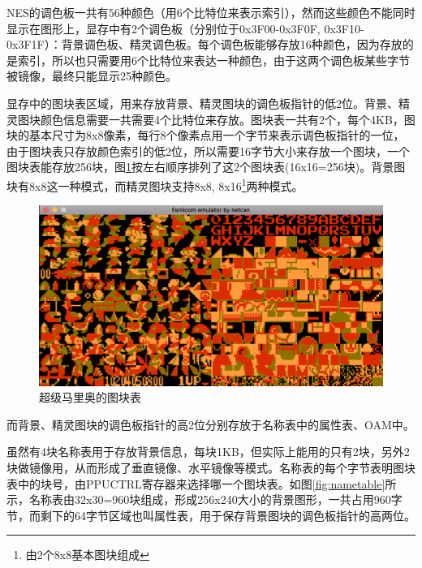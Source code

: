\documentclass[a4paper]{ltxdoc}
\begin{document}
{NES的调色板一共有56种颜色（用6个比特位来表示索引），然而这些颜色不能同时显示在图形上，显存中有2个调色板（分别位于0x3F00-0x3F0F, 0x3F10-0x3F1F）：背景调色板、精灵调色板。每个调色板能够存放16种颜色，因为存放的是索引，所以也只需要用6个比特位来表达一种颜色，由于这两个调色板某些字节被镜像，最终只能显示25种颜色。

显存中的图块表区域，用来存放背景、精灵图块的调色板指针的低2位。背景、精灵图块颜色信息需要一共需要4个比特位来存放。图块表一共有2个，每个4KB，图块的基本尺寸为8x8像素，每行8个像素点用一个字节来表示调色板指针的一位，由于图块表只存放颜色索引的低2位，所以需要16字节大小来存放一个图块，一个图块表能存放256块，图\ref{fig:pattern_table}按左右顺序排列了这2个图块表(16x16=256块)。背景图块有8x8这一种模式，而精灵图块支持8x8, 8x16\footnote{由2个8x8基本图块组成}两种模式。

\begin{figure}[h]
	\centering
	\includegraphics[width=\textwidth]{images/pattern_table.png}
	\caption{超级马里奥的图块表}
	\label{fig:pattern_table}
\end{figure}

而背景、精灵图块的调色板指针的高2位分别存放于名称表中的属性表、OAM中。

虽然有4块名称表用于存放背景信息，每块1KB，但实际上能用的只有2块，另外2块做镜像用，从而形成了垂直镜像、水平镜像等模式。名称表的每个字节表明图块表中的块号，由PPUCTRL寄存器来选择哪一个图块表。如图\ref{fig:nametable}所示，名称表由32x30=960块组成，形成256x240大小的背景图形，一共占用960字节，而剩下的64字节区域也叫属性表，用于保存背景图块的调色板指针的高两位。

}
\end{document}
